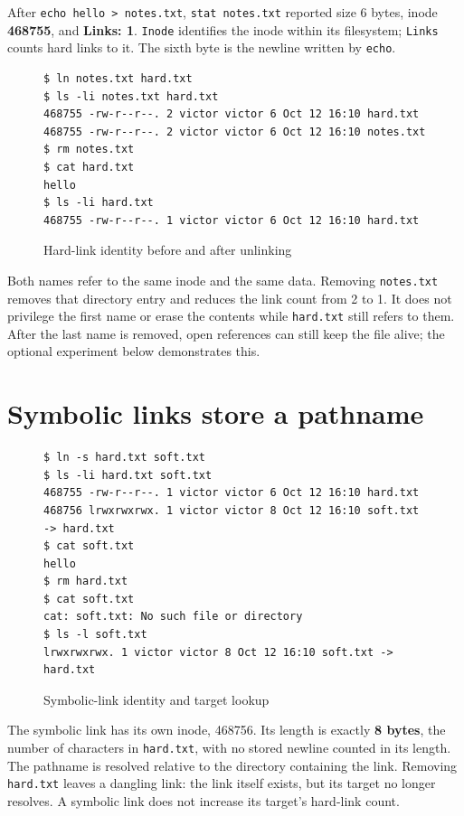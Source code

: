 \documentclass{../latex/utmreport}
\begin{document}
After \texttt{echo\ hello\ \textgreater{}\ notes.txt},
\texttt{stat\ notes.txt} reported size 6 bytes, inode \textbf{468755},
and \textbf{Links: 1}. \texttt{Inode} identifies the inode within its
filesystem; \texttt{Links} counts hard links to it. The sixth byte is
the newline written by \texttt{echo}.

\begin{figure}[H]
\begin{lstlisting}
$ ln notes.txt hard.txt
$ ls -li notes.txt hard.txt
468755 -rw-r--r--. 2 victor victor 6 Oct 12 16:10 hard.txt
468755 -rw-r--r--. 2 victor victor 6 Oct 12 16:10 notes.txt
$ rm notes.txt
$ cat hard.txt
hello
$ ls -li hard.txt
468755 -rw-r--r--. 1 victor victor 6 Oct 12 16:10 hard.txt
\end{lstlisting}
\caption{Hard-link identity before and after unlinking}
\end{figure}

Both names refer to the same inode and the same data. Removing
\texttt{notes.txt} removes that directory entry and reduces the link
count from 2 to 1. It does not privilege the first name or erase the
contents while \texttt{hard.txt} still refers to them. After the last
name is removed, open references can still keep the file alive; the
optional experiment below demonstrates this.

\section{Symbolic links store a
pathname}\label{symbolic-links-store-a-pathname}

\begin{figure}[H]
\begin{lstlisting}
$ ln -s hard.txt soft.txt
$ ls -li hard.txt soft.txt
468755 -rw-r--r--. 1 victor victor 6 Oct 12 16:10 hard.txt
468756 lrwxrwxrwx. 1 victor victor 8 Oct 12 16:10 soft.txt -> hard.txt
$ cat soft.txt
hello
$ rm hard.txt
$ cat soft.txt
cat: soft.txt: No such file or directory
$ ls -l soft.txt
lrwxrwxrwx. 1 victor victor 8 Oct 12 16:10 soft.txt -> hard.txt
\end{lstlisting}
\caption{Symbolic-link identity and target lookup}
\end{figure}

The symbolic link has its own inode, 468756. Its length is exactly
\textbf{8 bytes}, the number of characters in \texttt{hard.txt}, with no
stored newline counted in its length. The pathname is resolved relative
to the directory containing the link. Removing \texttt{hard.txt} leaves
a dangling link: the link itself exists, but its target no longer
resolves. A symbolic link does not increase its target's hard-link
count.
\end{document}
